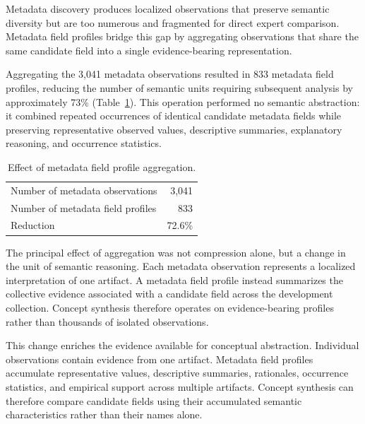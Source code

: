 \documentclass{article}
\begin{document}
Metadata discovery produces localized observations that preserve semantic diversity but are too numerous and fragmented for direct expert comparison. Metadata field profiles bridge this gap by aggregating observations that share the same candidate field into a single evidence-bearing representation.

Aggregating the 3,041 metadata observations resulted in 833 metadata field profiles, reducing the number of semantic units requiring subsequent analysis by approximately 73\% (Table~\ref{tab:aggregation_summary}). This operation performed no semantic abstraction: it combined repeated occurrences of identical candidate metadata fields while preserving representative observed values, descriptive summaries, explanatory reasoning, and occurrence statistics.

\begin{table}[!ht]
    \centering
    \caption{Effect of metadata field profile aggregation.}
    \label{tab:aggregation_summary}
    \begin{tabular}{lr}
        Number of metadata observations & 3,041 \\
        Number of metadata field profiles & 833 \\
        Reduction & 72.6\% \\
    \end{tabular}
\end{table}

The principal effect of aggregation was not compression alone, but a change in the unit of semantic reasoning. Each metadata observation represents a localized interpretation of one artifact. A metadata field profile instead summarizes the collective evidence associated with a candidate field across the development collection. Concept synthesis therefore operates on evidence-bearing profiles rather than thousands of isolated observations.

This change enriches the evidence available for conceptual abstraction. Individual observations contain evidence from one artifact. Metadata field profiles accumulate representative values, descriptive summaries, rationales, occurrence statistics, and empirical support across multiple artifacts. Concept synthesis can therefore compare candidate fields using their accumulated semantic characteristics rather than their names alone.
\end{document}
